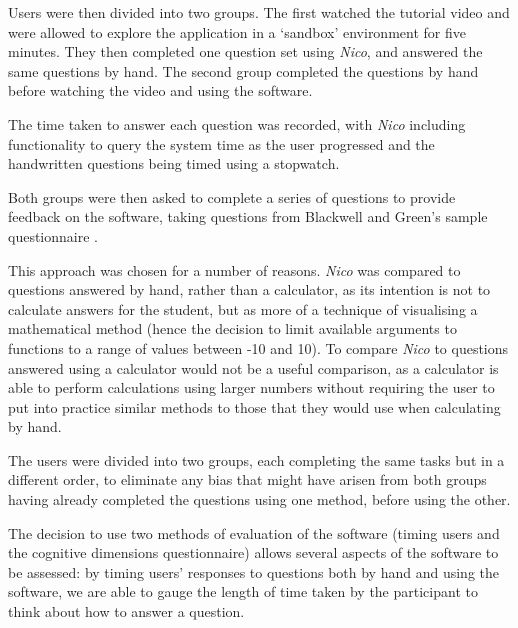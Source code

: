 \documentclass[12pt,twoside,notitlepage,xetex]{report}
\begin{document}
{Users were then divided into two groups.  The first watched the tutorial video and were allowed to explore the application in a `sandbox' environment for five minutes.  They then completed one question set using \emph{Nico}, and answered the same questions by hand.  The second group completed the questions by hand before watching the video and using the software.

The time taken to answer each question was recorded, with \emph{Nico} including functionality to query the system time as the user progressed and the handwritten questions being timed using a stopwatch.

Both groups were then asked to complete a series of questions to provide feedback on the software, taking questions from Blackwell and Green's sample questionnaire \cite{Blackwell2000}.

This approach was chosen for a number of reasons.  \emph{Nico} was compared to questions answered by hand, rather than a calculator, as its intention is not to calculate answers for the student, but as more of a technique of visualising a mathematical method (hence the decision to limit available arguments to functions to a range of values between -10 and 10).  To compare \emph{Nico} to questions answered using a calculator would not be a useful comparison, as a calculator is able to perform calculations using larger numbers without requiring the user to put into practice similar methods to those that they would use when calculating by hand.

The users were divided into two groups, each completing the same tasks but in a different order, to eliminate any bias that might have arisen from both groups having already completed the questions using one method, before using the other.

The decision to use two methods of evaluation of the software (timing users and the cognitive dimensions questionnaire) allows several aspects of the software to be assessed: by timing users' responses to questions both by hand and using the software, we are able to gauge the length of time taken by the participant to think about how to answer a question.

}
\end{document}
